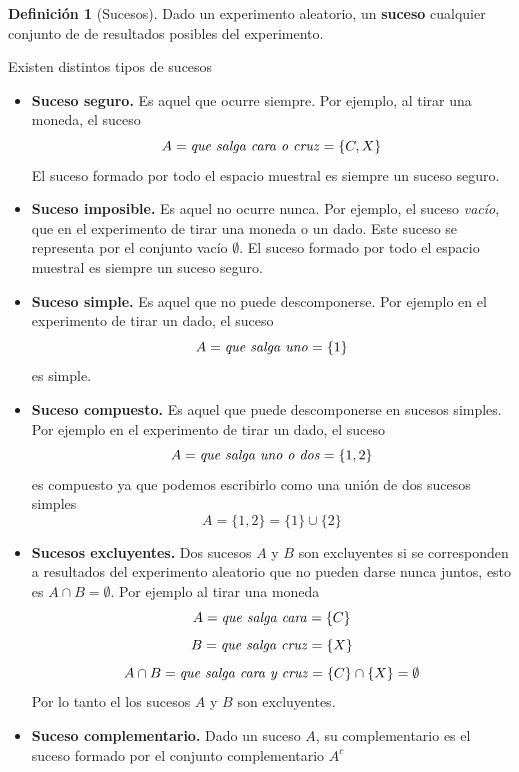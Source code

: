 \documentclass[]{book}
\theoremstyle{plain}
\theoremstyle{definition}
\newtheorem{definition}[theorem]{Definición}
\begin{document}
\begin{definition}[Sucesos]
  Dado un experimento aleatorio, un \textbf{suceso}  cualquier conjunto de de resultados posibles del experimento.

Existen distintos tipos de sucesos

\begin{itemize}
  \item \textbf{Suceso seguro.} Es aquel que ocurre siempre. Por ejemplo, al tirar  una moneda, el suceso 
  \[A=\text{\emph{que salga cara o cruz}} = \{C, X\}\]
  El suceso formado por todo el espacio muestral es siempre un suceso seguro.
  
  \item \textbf{Suceso imposible.} Es aquel no ocurre nunca. Por ejemplo,  el suceso \emph{vacío},
  que en el experimento de tirar una moneda o un dado. Este suceso se representa por el conjunto vacío $\emptyset$.
  El suceso formado por todo el espacio muestral es siempre un suceso seguro.

  \item \textbf{Suceso simple.} Es aquel que no puede descomponerse. Por ejemplo en el experimento de tirar un dado, el suceso
  \[A=\text{\emph{que salga uno}} = \{1\}\]
  es simple.
  \item \textbf{Suceso compuesto.}  Es aquel que puede descomponerse en sucesos simples. Por ejemplo en el experimento de tirar un dado, el suceso
  \[A=\text{\emph{que salga uno o dos}} = \{1, 2\}\]
  es compuesto ya que podemos escribirlo como una unión de dos sucesos simples
  \[A= \{1, 2\} = \{1\} \cup \{2\}\]
  \item \textbf{Sucesos excluyentes.}  Dos sucesos $A$ y $B$ son excluyentes si se corresponden a resultados del experimento aleatorio que no pueden 
  darse nunca juntos, esto es $A\cap B = \emptyset$. Por ejemplo al tirar una moneda 
  \[A=\text{\emph{que salga cara}} = \{C\}\]
  \[B=\text{\emph{que salga cruz}} = \{X\}\]
  \[A\cap B=\text{\emph{que salga cara y cruz}} = \{C\} \cap \{X\} = \emptyset\]
  Por lo tanto el los sucesos $A$ y $B$ son excluyentes.
  \item  \textbf{Suceso complementario.} Dado un suceso $A$, su complementario es el suceso formado 
  por el conjunto complementario $A^c$
\end{itemize}

\end{definition}
\end{document}
